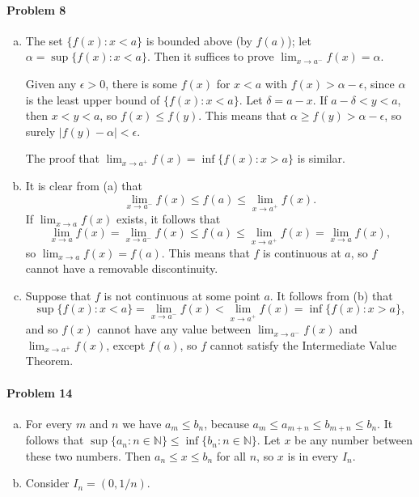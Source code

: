 \documentclass{article}
\begin{document}
\paragraph{Problem 8}
\begin{enumerate}[(a)]
  \item The set $\{f(x): x < a\}$ is bounded above (by $f(a)$); let $\alpha =
    \sup\{f(x): x < a\}$. Then it suffices to prove $\lim_{x \to a^-} f(x) =
    \alpha$.

    Given any $\epsilon > 0$, there is some $f(x)$ for $x < a$ with $f(x) >
    \alpha - \epsilon$, since $\alpha$ is the least upper bound of $\{f(x): x <
    a\}$. Let $\delta = a - x$. If $a - \delta < y < a$, then $x < y < a$, so
    $f(x) \leq f(y)$. This means that $\alpha \geq f(y) > \alpha - \epsilon$,
    so surely $|f(y) - \alpha| < \epsilon$.

    The proof that $\lim_{x \to a^+} f(x) = \inf\{f(x): x > a\}$ is similar.
  \item It is clear from (a) that \[
      \lim_{x \to a^-} f(x) \leq f(a) \leq \lim_{x \to a^+} f(x).
    \] If $\lim_{x \to a} f(x)$ exists, it follows that \[
      \lim_{x \to a} f(x)
      = \lim_{x \to a^-} f(x)
      \leq f(a)
      \leq \lim_{x \to a^+}f(x)
      = \lim_{x \to a}f(x),
    \] so $\lim_{x \to a} f(x) = f(a)$. This means that $f$ is continuous at
    $a$, so $f$ cannot have a removable discontinuity.
  \item Suppose that $f$ is not continuous at some point $a$. It follows from
    (b) that \[
      \sup\{f(x): x < a\}
      = \lim_{x \to a^-} f(x)
      < \lim_{x \to a^+} f(x)
      = \inf\{f(x): x > a\},
    \] and so $f(x)$ cannot have any value between $\lim_{x \to a^-} f(x)$ and
    $\lim_{x \to a^+} f(x)$, except $f(a)$, so $f$ cannot satisfy the
    Intermediate Value Theorem.
\end{enumerate}

\paragraph{Problem 14}
\begin{enumerate}[(a)]
  \item For every $m$ and $n$ we have $a_m \leq b_n$, because $a_m \leq a_{m+n}
    \leq b_{m+n} \leq b_n$. It follows that $\sup\{a_n: n \in \mathbb{N}\} \leq
    \inf\{b_n: n \in \mathbb{N}\}$. Let $x$ be any number between these two
    numbers. Then $a_n \leq x \leq b_n$ for all $n$, so $x$ is in every $I_n$.
  \item Consider $I_n = (0, 1/n)$.
\end{enumerate}
\end{document}
